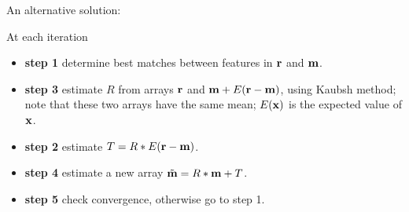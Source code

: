 An alternative solution:

At each iteration
\begin{itemize}
\item {\bf step 1} determine best matches between features in $\bf r$ and $\bf m$.
\item {\bf step 3} estimate $R$ from arrays ${\bf r}$ and ${\bf m}+E({\bf r}-{\bf m})$,  using Kaubsh method;
                   note that these two arrays have the same mean; $E({\bf x})$ is the expected value of $\bf x$.
\item {\bf step 2} estimate $T=R*E({\bf r}-{\bf m})$.
\item {\bf step 4} estimate a new array $\tilde{\bf m} = R*{\bf m} + T$.
\item {\bf step 5} check convergence, otherwise go to step 1.
\end{itemize}